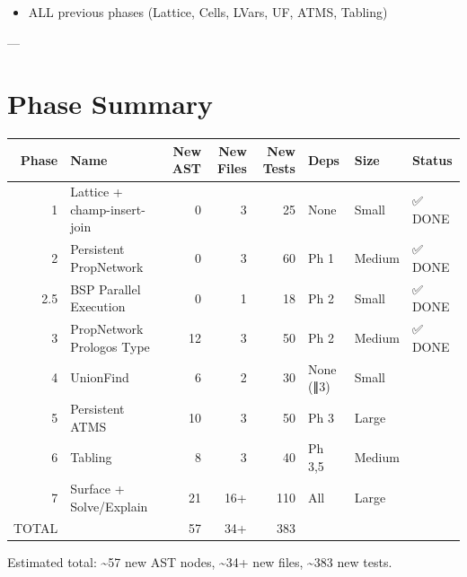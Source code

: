 \documentclass[11pt]{article}
\begin{document}
\begin{itemize}
\item ALL previous phases (Lattice, Cells, LVars, UF, ATMS, Tabling)
\end{itemize}

---
\section{Phase Summary}
\label{sec:orgb13f2e7}

\begin{center}
\begin{tabular}{rlrrrlll}
Phase & Name & New AST & New Files & New Tests & Deps & Size & Status\\
\hline
1 & Lattice + champ-insert-join & 0 & 3 & 25 & None & Small & ✅ DONE\\
2 & Persistent PropNetwork & 0 & 3 & 60 & Ph 1 & Medium & ✅ DONE\\
2.5 & BSP Parallel Execution & 0 & 1 & 18 & Ph 2 & Small & ✅ DONE\\
3 & PropNetwork Prologos Type & 12 & 3 & 50 & Ph 2 & Medium & ✅ DONE\\
4 & UnionFind & 6 & 2 & 30 & None (∥3) & Small & \\
5 & Persistent ATMS & 10 & 3 & 50 & Ph 3 & Large & \\
6 & Tabling & 8 & 3 & 40 & Ph 3,5 & Medium & \\
7 & Surface + Solve/Explain & 21 & 16+ & 110 & All & Large & \\
\hline
TOTAL &  & 57 & 34+ & 383 &  &  & \\
\end{tabular}
\end{center}

Estimated total: \textasciitilde{}57 new AST nodes, \textasciitilde{}34+ new files, \textasciitilde{}383 new tests.
\end{document}

